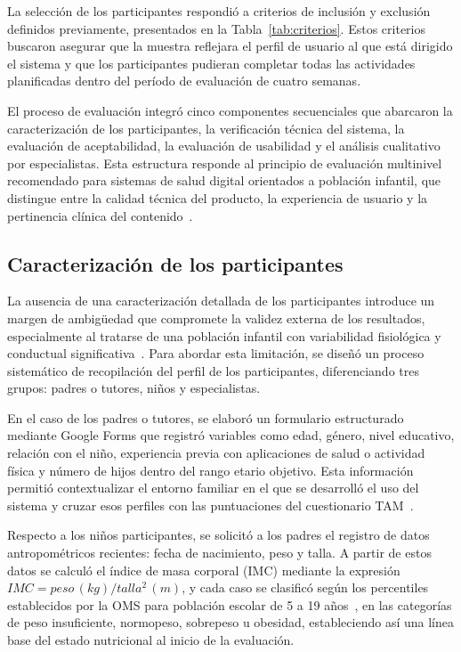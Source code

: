 			La selección de los participantes respondió a criterios de inclusión y exclusión definidos previamente, presentados en la Tabla~\ref{tab:criterios}. Estos criterios buscaron asegurar que la muestra reflejara el perfil de usuario al que está dirigido el sistema y que los participantes pudieran completar todas las actividades planificadas dentro del período de evaluación de cuatro semanas.
			
			El proceso de evaluación integró cinco componentes secuenciales que abarcaron la caracterización de los participantes, la verificación técnica del sistema, la evaluación de aceptabilidad, la evaluación de usabilidad y el análisis cualitativo por especialistas. Esta estructura responde al principio de evaluación multinivel recomendado para sistemas de salud digital orientados a población infantil, que distingue entre la calidad técnica del producto, la experiencia de usuario y la pertinencia clínica del contenido~\cite{GuerreroUlloa2024,Hourcade2015}.
		
			\subsection{Caracterización de los participantes}
				La ausencia de una caracterización detallada de los participantes introduce un margen de ambigüedad que compromete la validez externa de los resultados, especialmente al tratarse de una población infantil con variabilidad fisiológica y conductual significativa~\cite{Hourcade2015}. Para abordar esta limitación, se diseñó un proceso sistemático de recopilación del perfil de los participantes, diferenciando tres grupos: padres o tutores, niños y especialistas.
				
				En el caso de los padres o tutores, se elaboró un formulario estructurado mediante Google Forms que registró variables como edad, género, nivel educativo, relación con el niño, experiencia previa con aplicaciones de salud o actividad física y número de hijos dentro del rango etario objetivo. Esta información permitió contextualizar el entorno familiar en el que se desarrolló el uso del sistema y cruzar esos perfiles con las puntuaciones del cuestionario TAM~\cite{Venkatesh2003}.
				
				Respecto a los niños participantes, se solicitó a los padres el registro de datos antropométricos recientes: fecha de nacimiento, peso y talla. A partir de estos datos se calculó el índice de masa corporal (IMC) mediante la expresión $IMC = peso\,(kg) / talla^2\,(m)$, y cada caso se clasificó según los percentiles establecidos por la OMS para población escolar de 5 a 19 años~\cite{Bull2020}, en las categorías de peso insuficiente, normopeso, sobrepeso u obesidad, estableciendo así una línea base del estado nutricional al inicio de la evaluación.
				
